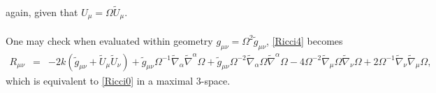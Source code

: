 \documentclass[10pt,letterpaper]{article}
\numberwithin{equation}{section}
\begin{document}
\begin{appendices}
\begin{eqnarray}
\label{Ricci4}
\end{eqnarray}
again, given that $U_\mu = \Omega \tilde U_\mu$. 
\\ \\
One may check when evaluated within geometry $g_{\mu\nu}=\Omega^2 \tilde g_{\mu\nu}$, \eqref{Ricci4} becomes
\begin{eqnarray}
R_{\mu\nu} &=& -2k(\tilde g_{\mu\nu} +\tilde U_\mu \tilde U_\nu) + \tilde{g}_{\mu \nu } \Omega^{-1} \tilde{\nabla}_{\alpha }\tilde{\nabla}^{\alpha }\Omega + \tilde{g}_{\mu \nu } \Omega^{-2} \tilde{\nabla}_{\alpha }\Omega \tilde{\nabla}^{\alpha }\Omega - 4 \Omega^{-2} \tilde{\nabla}_{\mu }\Omega \tilde{\nabla}_{\nu }\Omega + 2 \Omega^{-1} \tilde{\nabla}_{\nu }\tilde{\nabla}_{\mu }\Omega,
\end{eqnarray}
which is equivalent to \eqref{Ricci0} in a maximal 3-space.
\end{appendices}
\end{document}
